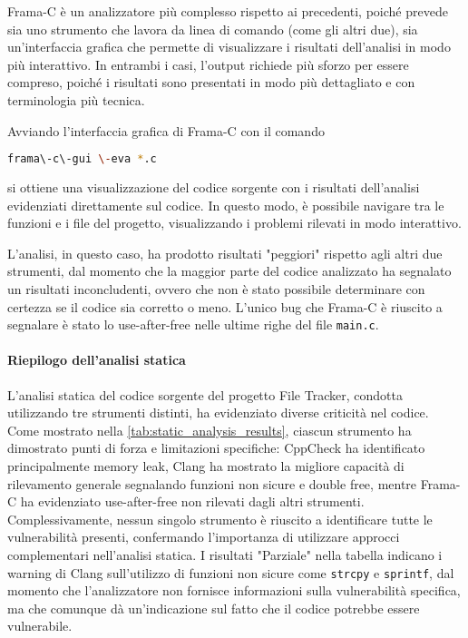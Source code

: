 Frama-C è un analizzatore più complesso rispetto ai precedenti, poiché prevede sia
uno strumento che lavora da linea di comando (come gli altri due), sia un'interfaccia
grafica che permette di visualizzare i risultati dell'analisi in modo più
interattivo. In entrambi i casi, l'output richiede più sforzo per essere
compreso, poiché i risultati sono presentati in modo più dettagliato e con terminologia
più tecnica.

Avviando l'interfaccia grafica di Frama-C con il comando \begin{lstlisting}[language=bash, numbers=none]
frama\-c\-gui \-eva *.c
\end{lstlisting}
si ottiene una visualizzazione del codice sorgente con i risultati dell'analisi evidenziati
direttamente sul codice. In questo modo, è possibile navigare tra le funzioni e i
file del progetto, visualizzando i problemi rilevati in modo interattivo.

L'analisi, in questo caso, ha prodotto risultati "peggiori" rispetto agli altri
due strumenti, dal momento che la maggior parte del codice analizzato ha segnalato
un risultati inconcludenti, ovvero che non è stato possibile determinare con
certezza se il codice sia corretto o meno. L'unico bug che Frama-C è riuscito a segnalare
è stato lo use-after-free nelle ultime righe del file \texttt{main.c}.

\bigskip
\noindent
\paragraph{Riepilogo dell'analisi statica}
L'analisi statica del codice sorgente del progetto File Tracker, condotta
utilizzando tre strumenti distinti, ha evidenziato diverse criticità nel codice.
Come mostrato nella \autoref{tab:static_analysis_results}, ciascun strumento ha dimostrato
punti di forza e limitazioni specifiche: CppCheck ha identificato principalmente
memory leak, Clang ha mostrato la migliore capacità di rilevamento generale segnalando
funzioni non sicure e double free, mentre Frama-C ha evidenziato use-after-free
non rilevati dagli altri strumenti. Complessivamente, nessun singolo strumento è
riuscito a identificare tutte le vulnerabilità presenti, confermando l'importanza
di utilizzare approcci complementari nell'analisi statica. I risultati "Parziale"
nella tabella indicano i warning di Clang sull'utilizzo di funzioni non sicure
come \texttt{strcpy} e \texttt{sprintf}, dal momento che l'analizzatore non fornisce
informazioni sulla vulnerabilità specifica, ma che comunque dà un'indicazione
sul fatto che il codice potrebbe essere vulnerabile.

